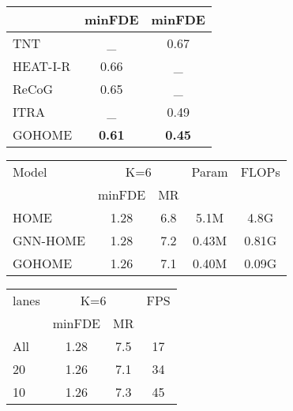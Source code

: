 \documentclass[letterpaper, 10 pt, conference]{ieeeconf}
\begin{document}
\begin{table*}[t]
\begin{minipage}{.3\linewidth}
\begin{center}
\begin{tabular}{l|c c}
  \hline
      & minFDE & minFDE \\
  \hline
  TNT \cite{zhao2020tnt} &  \_ & 0.67\\
  HEAT-I-R \cite{mo2021heterogeneous} & 0.66 & \_ \\
  ReCoG \cite{mo2020recog}  &   0.65 & \_ \\
  ITRA \cite{scibior2021imagining} & \_ & 0.49 \\
  GOHOME   &  \textbf{0.61} & \textbf{0.45} \\
  \hline
\end{tabular}
\end{center}
\label{tab:interaction}
\end{minipage}
\begin{minipage}{.4\linewidth}
\begin{center}
\begin{tabular}{l|c c|c| c}
  \hline
   Model   & \multicolumn{2}{c|}{K=6} & Param & FLOPs \\
  &  minFDE& MR &  \\
  \hline
  HOME &  1.28 & 6.8 & 5.1M  &  4.8G\\
  GNN-HOME  &   1.28 & 7.2 & 0.43M   & 0.81G\\
  GOHOME   &  1.26 & 7.1 & 0.40M & 0.09G \\
  \hline
\end{tabular}
\end{center}
\label{tab:gnn_speedup}
\end{minipage}
\begin{minipage}{.3\linewidth}
\begin{center}
\begin{tabular}{l|c c|c}
  \hline
    lanes    & \multicolumn{2}{c|}{K=6} & FPS \\
   & minFDE& MR &  \\
  \hline
  All  &  1.28 & 7.5 & 17\\
  20   &   1.26 & 7.1 & 34\\
  10   &  1.26 & 7.3 & 45\\
  \hline
\end{tabular}
\end{center}
\label{tab:rank_speedup}
\end{minipage}

\end{table*}
\end{document}
